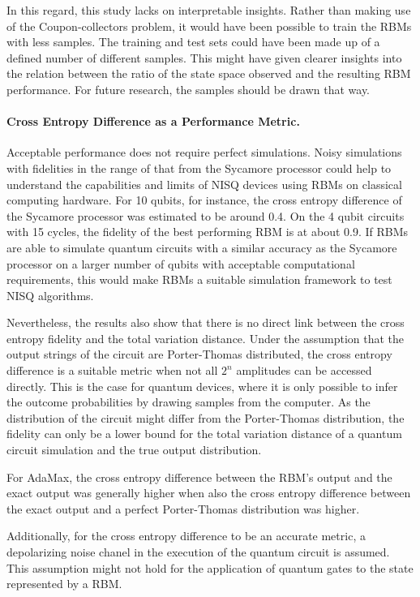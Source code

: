 In this regard, this study lacks on interpretable insights. Rather than making use of the 
Coupon-collectors problem, it would have been possible to train the RBMs with less samples. 
The training and test sets could have been made up of a defined number of different 
samples. This might have given clearer insights into the relation between the ratio of the 
state space observed and the resulting RBM performance. For future research, the samples should
be drawn that way.

\paragraph{Cross Entropy Difference as a Performance Metric.}
Acceptable performance does not require perfect simulations. Noisy simulations with 
fidelities in the range of that from the Sycamore processor could help to understand the 
capabilities and limits of NISQ devices using RBMs on classical computing hardware. For 10 qubits, for instance, the cross entropy difference
of the Sycamore processor was estimated to be around 0.4. On the 4 qubit circuits with 
15 cycles, the fidelity of the best performing RBM is at about 0.9. 
If RBMs are able to simulate quantum circuits with a similar accuracy as the Sycamore 
processor on a larger number of qubits with acceptable computational requirements, this 
would make RBMs a suitable simulation framework to test NISQ algorithms.

Nevertheless, the results also show that there is no direct link between the cross entropy
fidelity and the total variation distance. Under the assumption that the output strings of 
the circuit are Porter-Thomas distributed, the cross entropy difference is a suitable metric
when not all $2^n$ amplitudes can be accessed directly. This is the case for quantum devices, 
where it is only possible to infer the outcome probabilities by drawing samples from the computer.
As the distribution of the circuit might differ from the Porter-Thomas distribution, 
the fidelity can only be a lower bound for the total variation distance of a quantum circuit simulation
and the true output distribution.

For AdaMax, the cross entropy difference between the RBM's output and the exact output was 
generally higher when also the cross entropy difference between the exact output and a perfect Porter-Thomas 
distribution was higher. 

Additionally, for the cross entropy difference to be an accurate 
metric, a depolarizing noise chanel in the execution of the quantum circuit is assumed. This assumption 
might not hold for the application of quantum gates to the state represented by a RBM.

